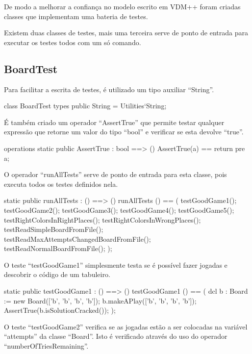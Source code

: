 De modo a melhorar a confiança no modelo escrito em VDM++ foram
criadas classes que implementam uma bateria de testes.

Existem duas classes de testes, mais uma terceira serve de ponto de
entrada para executar os testes todos com um só comando.

\subsection{BoardTest}

Para facilitar a escrita de testes, é utilizado um tipo auxiliar ``String''.

\begin{vdm_al}
  class BoardTest
    types
      public String = Utilities`String;
\end{vdm_al}

É também criado um operador ``AssertTrue'' que permite testar qualquer
expressão que retorne um valor do tipo ``bool'' e verificar se esta
devolve ``true''.

\begin{vdm_al}
    operations
    static public AssertTrue : bool ==> ()
      AssertTrue(a) == return
    pre a;
\end{vdm_al}
  
O operador ``runAllTests'' serve de ponto de entrada para esta classe,
pois executa todos os testes definidos nela.

\begin{vdm_al}
    static public runAllTests : () ==> ()
      runAllTests () == (
        testGoodGame1();
        testGoodGame2();
        testGoodGame3();
        testGoodGame4();
        testGoodGame5();
        testRightColorsInRightPlaces();
        testRightColorsInWrongPlaces();
        testReadSimpleBoardFromFile();
        testReadMaxAttemptsChangedBoardFromFile();
        testReadNormalBoardFromFile();
      );
\end{vdm_al}

O teste ``testGoodGame1'' simplesmente testa se é possível fazer
jogadas e descobrir o código de um tabuleiro.  


\begin{vdm_al}
    static public testGoodGame1 : () ==> ()
    testGoodGame1 () ==
    ( dcl b : Board := new Board(['b', 'b', 'b', 'b']);
      b.makeAPlay(['b', 'b', 'b', 'b']);
      AssertTrue(b.isSolutionCracked());
    );
\end{vdm_al}

O teste ``testGoodGame2'' verifica se as jogadas estão a ser colocadas
na variável ``attempts'' da classe ``Board''. Isto é verificado
através do uso do operador ``numberOfTriesRemaining''.  
  
